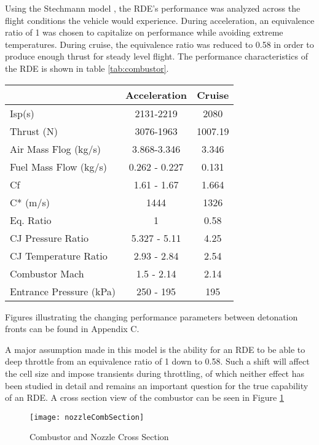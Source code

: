     Using the Stechmann model \cite{stechmann}, the RDE’s performance was analyzed across the flight conditions the vehicle would experience. During acceleration, an equivalence ratio of 1 was chosen to capitalize on performance while avoiding extreme temperatures. During cruise, the equivalence ratio was reduced to 0.58 in order to produce enough thrust for steady level flight. The performance characteristics of the RDE is shown in table \ref{tab:combustor}.

\begin{center}
\begin{tabular}{l c c}
& Acceleration & Cruise \\
\hline
Isp(s) & 2131-2219 & 2080 \\
Thrust (N) & 3076-1963 & 1007.19 \\
Air Mass Flog (kg/s) & 3.868-3.346 & 3.346 \\
Fuel Mass Flow (kg/s) & 0.262 - 0.227 & 0.131 \\
Cf & 1.61 - 1.67 & 1.664 \\
C* (m/s) & 1444 & 1326 \\
Eq. Ratio & 1 & 0.58 \\
CJ Pressure Ratio & 5.327 - 5.11 & 4.25 \\
CJ Temperature Ratio & 2.93 - 2.84 & 2.54 \\
Combustor Mach & 1.5 - 2.14 & 2.14 \\
Entrance Pressure (kPa) & 250 - 195 & 195
\end{tabular}
\label{tab:combustor}
\end{center}

Figures illustrating the changing performance parameters between detonation fronts can be found in Appendix C.

    A major assumption made in this model is the ability for an RDE to be able to deep throttle from an equivalence ratio of 1 down to 0.58. Such a shift will affect the cell size and impose transients during throttling, of which neither effect has been studied in detail and remains an important question for the true capability of an RDE. A cross section view of the combustor can be seen in Figure \ref{fig:nozzleCombSection}
    
 \begin{figure}[H]
\begin{center}
\texttt{[image: nozzleCombSection]}
\caption{Combustor and Nozzle Cross Section}
\label{fig:nozzleCombSection}
\end{center}
\end{figure}
